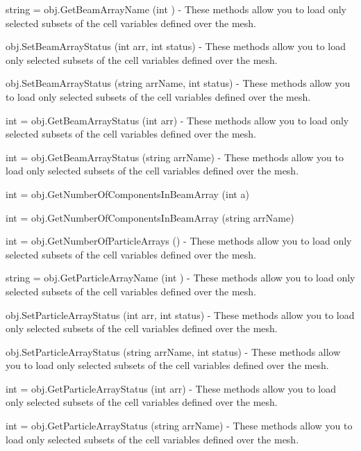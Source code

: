 \begin{DoxyItemize}
\item {\ttfamily string = obj.\-Get\-Beam\-Array\-Name (int )} -\/ These methods allow you to load only selected subsets of the cell variables defined over the mesh.  
\item {\ttfamily obj.\-Set\-Beam\-Array\-Status (int arr, int status)} -\/ These methods allow you to load only selected subsets of the cell variables defined over the mesh.  
\item {\ttfamily obj.\-Set\-Beam\-Array\-Status (string arr\-Name, int status)} -\/ These methods allow you to load only selected subsets of the cell variables defined over the mesh.  
\item {\ttfamily int = obj.\-Get\-Beam\-Array\-Status (int arr)} -\/ These methods allow you to load only selected subsets of the cell variables defined over the mesh.  
\item {\ttfamily int = obj.\-Get\-Beam\-Array\-Status (string arr\-Name)} -\/ These methods allow you to load only selected subsets of the cell variables defined over the mesh.  
\item {\ttfamily int = obj.\-Get\-Number\-Of\-Components\-In\-Beam\-Array (int a)}  
\item {\ttfamily int = obj.\-Get\-Number\-Of\-Components\-In\-Beam\-Array (string arr\-Name)}  
\item {\ttfamily int = obj.\-Get\-Number\-Of\-Particle\-Arrays ()} -\/ These methods allow you to load only selected subsets of the cell variables defined over the mesh.  
\item {\ttfamily string = obj.\-Get\-Particle\-Array\-Name (int )} -\/ These methods allow you to load only selected subsets of the cell variables defined over the mesh.  
\item {\ttfamily obj.\-Set\-Particle\-Array\-Status (int arr, int status)} -\/ These methods allow you to load only selected subsets of the cell variables defined over the mesh.  
\item {\ttfamily obj.\-Set\-Particle\-Array\-Status (string arr\-Name, int status)} -\/ These methods allow you to load only selected subsets of the cell variables defined over the mesh.  
\item {\ttfamily int = obj.\-Get\-Particle\-Array\-Status (int arr)} -\/ These methods allow you to load only selected subsets of the cell variables defined over the mesh.  
\item {\ttfamily int = obj.\-Get\-Particle\-Array\-Status (string arr\-Name)} -\/ These methods allow you to load only selected subsets of the cell variables defined over the mesh.  

\end{DoxyItemize}
